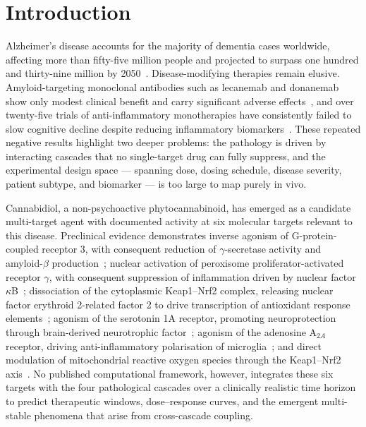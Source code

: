 \documentclass[10pt,letterpaper]{article}
\begin{document}
\section{Introduction}
\label{sec:introduction}

Alzheimer's disease accounts for the majority of dementia cases worldwide, affecting more than fifty-five million people and projected to surpass one hundred and thirty-nine million by 2050~\cite{who2023}. Disease-modifying therapies remain elusive. Amyloid-targeting monoclonal antibodies such as lecanemab and donanemab show only modest clinical benefit and carry significant adverse effects~\cite{vandyck2023}, and over twenty-five trials of anti-inflammatory monotherapies have consistently failed to slow cognitive decline despite reducing inflammatory biomarkers~\cite{adapt2007,imbimbo2010}. These repeated negative results highlight two deeper problems: the pathology is driven by interacting cascades that no single-target drug can fully suppress, and the experimental design space --- spanning dose, dosing schedule, disease severity, patient subtype, and biomarker --- is too large to map purely in vivo.

Cannabidiol, a non-psychoactive phytocannabinoid, has emerged as a candidate multi-target agent with documented activity at six molecular targets relevant to this disease. Preclinical evidence demonstrates inverse agonism of G-protein-coupled receptor 3, with consequent reduction of $\gamma$-secretase activity and amyloid-$\beta$ production~\cite{huang2015}; nuclear activation of peroxisome proliferator-activated receptor $\gamma$, with consequent suppression of inflammation driven by nuclear factor $\kappa$B~\cite{esposito2011}; dissociation of the cytoplasmic Keap1--Nrf2 complex, releasing nuclear factor erythroid 2-related factor 2 to drive transcription of antioxidant response elements~\cite{casares2020}; agonism of the serotonin 1A receptor, promoting neuroprotection through brain-derived neurotrophic factor~\cite{russo2005}; agonism of the adenosine A$_{2A}$ receptor, driving anti-inflammatory polarisation of microglia~\cite{mecha2013}; and direct modulation of mitochondrial reactive oxygen species through the Keap1--Nrf2 axis~\cite{booz2011}. No published computational framework, however, integrates these six targets with the four pathological cascades over a clinically realistic time horizon to predict therapeutic windows, dose--response curves, and the emergent multi-stable phenomena that arise from cross-cascade coupling.
\end{document}
